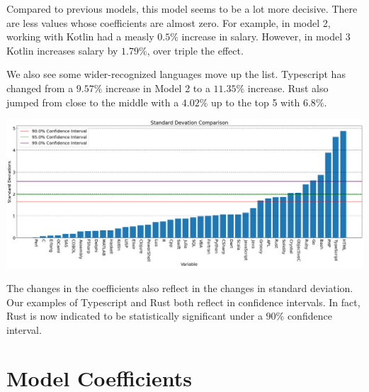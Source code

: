 \documentclass{report}
\begin{document}
\vspace{0.5in}

Compared to previous models, this model seems to be a lot more decisive. There are less values whose coefficients are almost zero. For example, in model 2, working with Kotlin had a measly $0.5\%$ increase in salary. However, in model 3 Kotlin increases salary by $1.79\%$, over triple the effect.

We also see some wider-recognized languages move up the list. Typescript has changed from a $9.57\%$ increase in Model 2 to a $11.35\%$ increase. Rust also jumped from close to the middle with a $4.02\%$ up to the top 5 with $6.8\%$.

\vspace{0.5in}

\includegraphics[width=0.9\linewidth]{model3confidencelanguages.png}

\vspace{0.5in}

The changes in the coefficients also reflect in the changes in standard deviation. Our examples of Typescript and Rust both reflect in confidence intervals. In fact, Rust is now indicated to be statistically significant under a $90\%$ confidence interval.


\appendix

\chapter{Model Coefficients}
\end{document}
